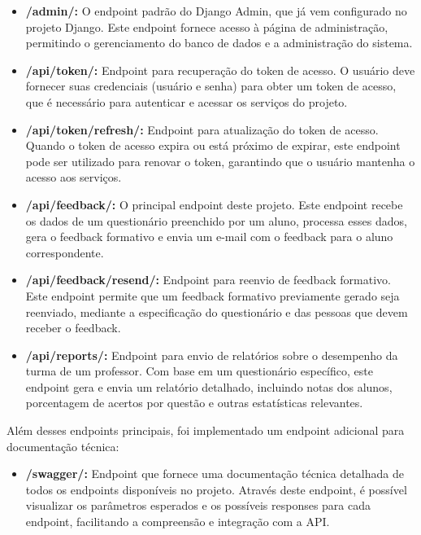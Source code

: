 \begin{itemize}
    \item \textbf{/admin/:} O endpoint padrão do Django Admin, que já vem configurado no projeto Django. Este endpoint fornece acesso à página de administração, permitindo o gerenciamento do banco de dados e a administração do sistema.

    \item \textbf{/api/token/:} Endpoint para recuperação do token de acesso. O usuário deve fornecer suas credenciais (usuário e senha) para obter um token de acesso, que é necessário para autenticar e acessar os serviços do projeto.

    \item \textbf{/api/token/refresh/:} Endpoint para atualização do token de acesso. Quando o token de acesso expira ou está próximo de expirar, este endpoint pode ser utilizado para renovar o token, garantindo que o usuário mantenha o acesso aos serviços.

    \item \textbf{/api/feedback/:} O principal endpoint deste projeto. Este endpoint recebe os dados de um questionário preenchido por um aluno, processa esses dados, gera o feedback formativo e envia um e-mail com o feedback para o aluno correspondente.

    \item \textbf{/api/feedback/resend/:} Endpoint para reenvio de feedback formativo. Este endpoint permite que um feedback formativo previamente gerado seja reenviado, mediante a especificação do questionário e das pessoas que devem receber o feedback.

    \item \textbf{/api/reports/:} Endpoint para envio de relatórios sobre o desempenho da turma de um professor. Com base em um questionário específico, este endpoint gera e envia um relatório detalhado, incluindo notas dos alunos, porcentagem de acertos por questão e outras estatísticas relevantes.
\end{itemize}

Além desses endpoints principais, foi implementado um endpoint adicional para documentação técnica:

\begin{itemize}
    \item \textbf{/swagger/:} Endpoint que fornece uma documentação técnica detalhada de todos os endpoints disponíveis no projeto. Através deste endpoint, é possível visualizar os parâmetros esperados e os possíveis responses para cada endpoint, facilitando a compreensão e integração com a API.
\end{itemize}

